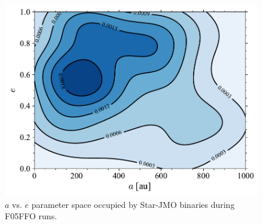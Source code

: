 \documentclass[aa]{lib/aa}
\begin{document}
   \begin{figure}
    \centering
        \includegraphics[width=\columnwidth]{figures/Fractal_rvir0.5_FF_Obs_sem_ecc_mixed_systs.pdf}
        \caption{$a$ vs. $e$ parameter space occupied by Star-JMO binaries during F05FFO runs.}
         \label{Fig:MixedSys_OrbParams}
   \end{figure}
\end{document}

